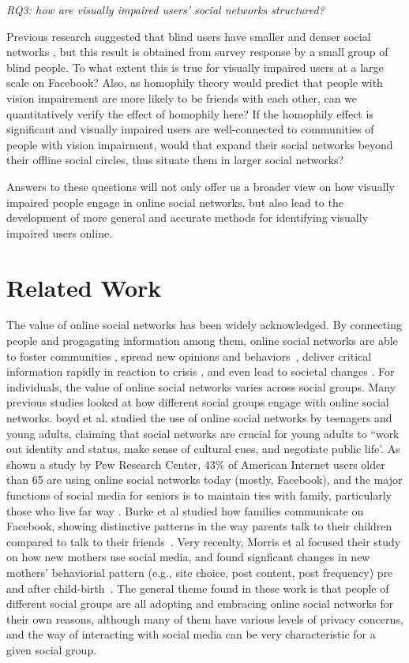 \documentclass{sigchi}
\begin{document}
\emph{RQ3: how are visually impaired users' social networks structured? }

Previous research suggested that blind users have smaller and denser social networks \cite{brady2013cscw}, but this result is obtained from survey response by a small group of blind people. To what extent this is true for visually impaired users at a large scale on Facebook? Also, as homophily theory would predict that people with vision impairement are more likely to be friends with each other, can we quantitatively verify the effect of homophily here? If the homophily effect is significant and visually impaired users are well-connected to communities of people with vision impairment, would that expand their social networks beyond their offline social circles, thus situate them in larger social networks? 


Answers to these questions will not only offer us a broader view on how  visually impaired people engage in online social networks, but also lead to the development of more general and accurate methods for identifying visually impaired users online. 

\section{Related Work}

The value of online social networks has been widely acknowledged. By connecting people and progagating    information among them, online social networks are able to foster communities \cite{backstrom2006}, spread new opinions and behaviors~\cite{romero2011,wu2011}, deliver critical information rapidly in reaction to crisis \cite{Goolsby:2010}, and even lead to societal changes \cite{weber2013}.  For individuals, the value of online social networks varies across social groups. Many previous studies looked at how different social groups engage with online social networks. boyd et al. \cite{boyd2007} studied the use of online social networks by teenagers and young adults, claiming that social networks are crucial for young adults to ``work out identity and status, make sense of cultural cues, and negotiate public life'. As shown a study by Pew Research Center, $43\%$ of American Internet users older than 65 are using online social networks today (mostly, Facebook), and the major functions of social media for seniors is to maintain ties with family, particularly those who live far way \cite{pew_seniors}. Burke et al studied how families communicate on Facebook, showing distinctive patterns in the way parents talk to their children compared to talk to their friends~\cite{burke2013}.  Very recenlty, Morris et al focused their study on how new mothers use social media, and found signficant changes in new mothers' behaviorial pattern (e.g., site choice, post content, post frequency) pre and after child-birth~\cite{morris2014}. The general theme found in these work is that people of different social groups are all adopting and embracing online social networks for their own reasons, although many of them have various levels of privacy concerns, and the way of interacting with social media can be very characteristic for a given social group.
\end{document}
